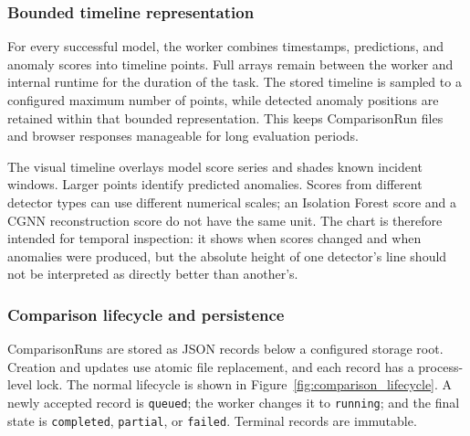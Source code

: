 \subsubsection{Bounded timeline representation}

For every successful model, the worker combines timestamps, predictions, and anomaly scores into timeline points. Full arrays remain between the worker and internal runtime for the duration of the task. The stored timeline is sampled to a configured maximum number of points, while detected anomaly positions are retained within that bounded representation. This keeps ComparisonRun files and browser responses manageable for long evaluation periods.

The visual timeline overlays model score series and shades known incident windows. Larger points identify predicted anomalies. Scores from different detector types can use different numerical scales; an Isolation Forest score and a CGNN reconstruction score do not have the same unit. The chart is therefore intended for temporal inspection: it shows when scores changed and when anomalies were produced, but the absolute height of one detector's line should not be interpreted as directly better than another's.

\subsubsection{Comparison lifecycle and persistence}

ComparisonRuns are stored as JSON records below a configured storage root. Creation and updates use atomic file replacement, and each record has a process-level lock. The normal lifecycle is shown in Figure~\ref{fig:comparison_lifecycle}. A newly accepted record is \texttt{queued}; the worker changes it to \texttt{running}; and the final state is \texttt{completed}, \texttt{partial}, or \texttt{failed}. Terminal records are immutable.

